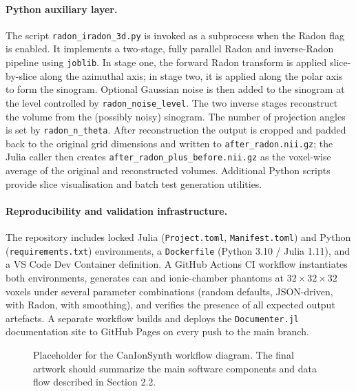 \documentclass[preprint,12pt, a4paper]{elsarticle}
\begin{document}
\paragraph{Python auxiliary layer.}
The script \mbox{\texttt{radon\_iradon\_3d.py}} is invoked as a subprocess when the Radon flag is enabled. It implements a two-stage, fully parallel Radon and inverse-Radon pipeline using \mbox{\texttt{joblib}}. In stage one, the forward Radon transform is applied slice-by-slice along the azimuthal axis; in stage two, it is applied along the polar axis to form the sinogram. Optional Gaussian noise is then added to the sinogram at the level controlled by \mbox{\texttt{radon\_noise\_level}}. The two inverse stages reconstruct the volume from the (possibly noisy) sinogram. The number of projection angles is set by \mbox{\texttt{radon\_n\_theta}}. After reconstruction the output is cropped and padded back to the original grid dimensions and written to \mbox{\texttt{after\_radon.nii.gz}}; the Julia caller then creates \mbox{\texttt{after\_radon\_plus\_before.nii.gz}} as the voxel-wise average of the original and reconstructed volumes. Additional Python scripts provide slice visualisation and batch test generation utilities.

\paragraph{Reproducibility and validation infrastructure.}
The repository includes locked Julia (\mbox{\texttt{Project.toml}}, \mbox{\texttt{Manifest.toml}}) and Python (\mbox{\texttt{requirements.txt}}) environments, a \mbox{\texttt{Dockerfile}} (Python 3.10 / Julia 1.11), and a VS Code Dev Container definition. A GitHub Actions CI workflow instantiates both environments, generates can and ionic-chamber phantoms at $32 \times 32 \times 32$ voxels under several parameter combinations (random defaults, JSON-driven, with Radon, with smoothing), and verifies the presence of all expected output artefacts. A separate workflow builds and deploys the \mbox{\texttt{Documenter.jl}} documentation site to GitHub Pages on every push to the main branch.

\begin{figure}[!h]
\centering
{}
\caption{Placeholder for the CanIonSynth workflow diagram. The final artwork should summarize the main software components and data flow described in Section 2.2.}
\label{fig:workflow}
\end{figure}
\end{document}
